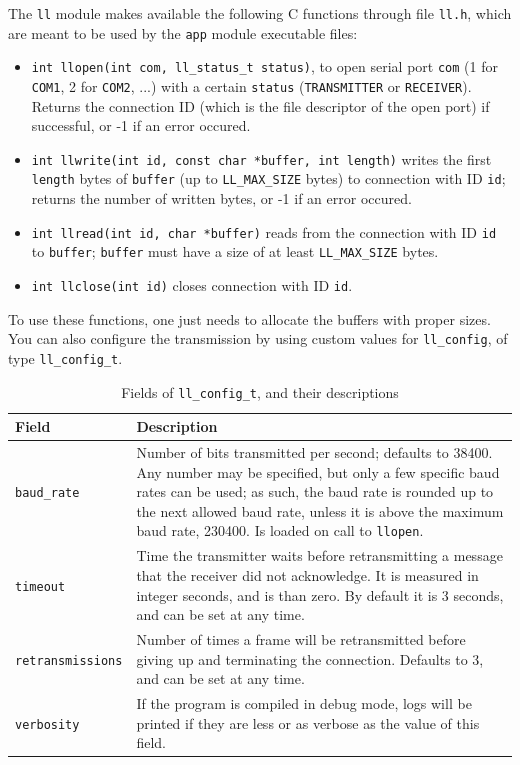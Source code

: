 \documentclass[a4paper, 11pt]{report}
\begin{document}
The \texttt{ll} module makes available the following C functions through file \texttt{ll.h}, which are meant to be used by the \texttt{app} module executable files:
\begin{itemize}
	\itemsep0em
	\item \texttt{int llopen(int com, ll\_status\_t status)}, to open serial port \texttt{com} (1 for \texttt{COM1}, 2 for \texttt{COM2}, ...) with a certain \texttt{status} (\texttt{TRANSMITTER} or \texttt{RECEIVER}). Returns the connection ID (which is the file descriptor of the open port) if successful, or -1 if an error occured.
	\item \texttt{int llwrite(int id, const char *buffer, int length)} writes the first \texttt{length} bytes of \texttt{buffer} (up to \texttt{LL\_MAX\_SIZE} bytes) to connection with ID \texttt{id}; returns the number of written bytes, or -1 if an error occured.
	\item \texttt{int llread(int id, char *buffer)} reads from the connection with ID \texttt{id} to \texttt{buffer}; \texttt{buffer} must have a size of at least \texttt{LL\_MAX\_SIZE} bytes.
	\item \texttt{int llclose(int id)} closes connection with ID \texttt{id}.
\end{itemize}

To use these functions, one just needs to allocate the buffers with proper sizes. You can also configure the transmission by using custom values for \texttt{ll\_config}, of type \texttt{ll\_config\_t}.

\begin{table}[H]
	\centering
	\begin{tabular}{l | p{12cm}}
		\hline \hline
		\textbf{Field}           & \textbf{Description} \\ \hline
		\texttt{baud\_rate}      & Number of bits transmitted per second; defaults to 38400. Any number may be specified, but only a few specific baud rates can be used; as such, the baud rate is rounded up to the next allowed baud rate, unless it is above the maximum baud rate, 230400. Is loaded on call to \texttt{llopen}. \\ \hline
		\texttt{timeout}         & Time the transmitter waits before retransmitting a message that the receiver did not acknowledge. It is measured in integer seconds, and is than zero. By default it is 3 seconds, and can be set at any time. \\ \hline
		\texttt{retransmissions} & Number of times a frame will be retransmitted before giving up and terminating the connection. Defaults to 3, and can be set at any time. \\ \hline
		\texttt{verbosity}       & If the program is compiled in debug mode, logs will be printed if they are less or as verbose as the value of this field.\\ \hline \hline
	\end{tabular}
	\caption{Fields of \texttt{ll\_config\_t}, and their descriptions}
\end{table}
\end{document}
